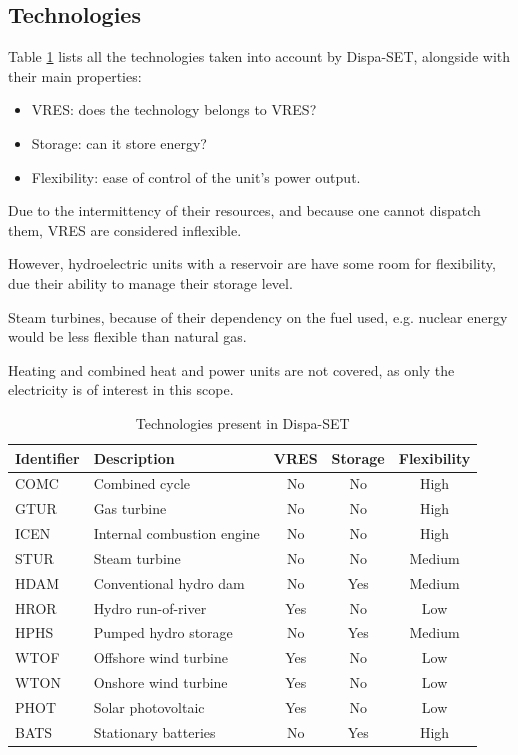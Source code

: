\subsection{Technologies}

Table \ref{table:technologies-eu} lists all the technologies taken into account by Dispa-SET, alongside with their main properties: 

\begin{itemize}
    \item VRES: does the technology belongs to VRES?
    \item Storage: can it store energy?
    \item Flexibility: ease of control of the unit's power output.
\end{itemize}

Due to the intermittency of their resources, and because one cannot dispatch them, VRES are considered inflexible.

However, hydroelectric units with a reservoir are have some room for flexibility, due their ability to manage their storage level.

Steam turbines, because of their dependency on the fuel used, e.g. nuclear energy would be less flexible than natural gas.

Heating and combined heat and power units are not covered, as only the electricity is of interest in this scope.

\begin{table}
    \centering
    \begin{tabular}{|l l c c c|}
        \hline
		Identifier & Description & VRES & Storage & Flexibility\\
		\hline
		COMC & Combined cycle             & No  & No  & High\\
		GTUR & Gas turbine                & No  & No  & High\\
		ICEN & Internal combustion engine & No  & No  & High\\
		STUR & Steam turbine              & No  & No  & Medium\\
		HDAM & Conventional hydro dam     & No  & Yes & Medium \\
		HROR & Hydro run-of-river         & Yes & No  & Low\\
		HPHS & Pumped hydro storage       & No  & Yes & Medium\\
		WTOF & Offshore wind turbine      & Yes & No  & Low\\
		WTON & Onshore wind turbine       & Yes & No  & Low\\
		PHOT & Solar photovoltaic         & Yes & No  & Low\\
		BATS & Stationary batteries       & No  & Yes & High\\
		\hline
    \end{tabular}
    \caption{Technologies present in Dispa-SET}
    \label{table:technologies-eu}
\end{table}


